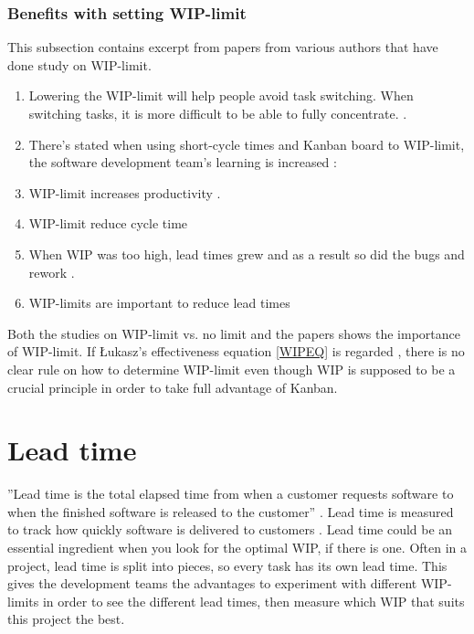 \documentclass[UKenglish]{ifimaster}  %
\begin{document}
\subsubsection{Benefits with setting WIP-limit}
\label{sub:sub:benefits}
This subsection contains excerpt from papers from various authors that have done study on WIP-limit. 

\begin{enumerate}
\item Lowering the WIP-limit will help people avoid task switching. When switching tasks, it is more difficult to be able to fully concentrate. \parencite{Ikonen}.
\item There's stated when using short-cycle times and Kanban board to WIP-limit, the software development team's learning is increased \parencite{Joyce}:
\item WIP-limit increases productivity \parencite{Joyce}.
\item WIP-limit reduce cycle time \parencite{Ola}
\item When WIP was too high, lead times grew and as a result so did the bugs and rework \parencite{Shinkle}.
\vspace{-0.3em}
\item  WIP-limits are important to reduce lead times \parencite{KanbanWay} 
\end{enumerate}

Both the studies on WIP-limit vs. no limit and the papers shows the importance of WIP-limit. If  \L ukasz's effectiveness equation \ref{WIPEQ} is regarded , there is no clear rule on how to determine WIP-limit even though WIP is supposed to be a crucial principle in order to take full advantage of Kanban.

\section {Lead time}
\label{sec:in:lt}
''Lead time is the total elapsed time from when a customer requests software to when the finished software is released to the customer'' \parencite{Joyce}. Lead time is measured to track how quickly software is delivered to customers \parencite{Joyce}. Lead time could be an essential ingredient when you look for the optimal WIP, if there is one.  Often in a project, lead time is split into pieces, so every task has its own lead time. This gives the development teams the advantages to experiment with different WIP-limits in order to see the different lead times, then measure which WIP that suits this project the best. 
\end{document}
